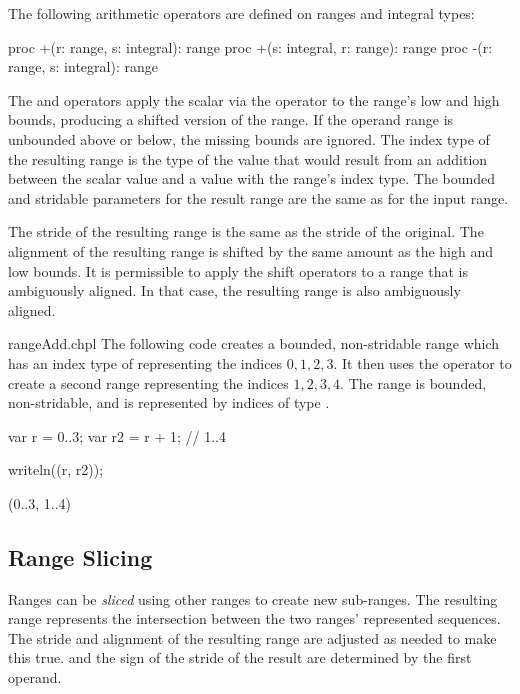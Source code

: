 The following arithmetic operators are defined on ranges and integral
types:

\begin{chapel}
proc +(r: range, s: integral): range
proc +(s: integral, r: range): range
proc -(r: range, s: integral): range
\end{chapel}

The \chpl{+} and \chpl{-} operators apply the scalar via the operator
to the range's low and high bounds, producing a shifted version of the
range.  If the operand range is unbounded above or below, the missing bounds
are ignored.
The index type of the resulting range is the type of the value
that would result from an addition between the scalar value and a value
with the range's index type.  The bounded and stridable parameters for
the result range are the same as for the input range.

The stride of the resulting range is the same as the stride of the
original. The alignment of the resulting range is shifted by the same amount as
the high and low bounds.  It is permissible to apply the shift operators to a
range that is ambiguously aligned.  In that case, the resulting range is also
ambiguously aligned.

\begin{chapelexample}{rangeAdd.chpl}
The following code creates a bounded, non-stridable range 
which has an index type of  representing the indices ${0, 1, 2, 3}$.  
It then uses the \chpl{+} operator to create a second range 
representing the indices ${1, 2, 3, 4}$.  The  range is bounded,
non-stridable, and is represented by indices of type .
\begin{chapel}
var r = 0..3;
var r2 = r + 1;    // 1..4
\end{chapel}
\begin{chapelpost}
writeln((r, r2));
\end{chapelpost}
\begin{chapeloutput}
(0..3, 1..4)
\end{chapeloutput}
\end{chapelexample}


\subsection{Range Slicing}
\label{Range_Slicing}

Ranges can be \emph{sliced} using other ranges to create new
sub-ranges.  The resulting range represents the intersection between
the two ranges' represented sequences.  The stride and alignment of the resulting range are adjusted as
needed to make this true.
 and the sign of the stride of the result are determined
by the first operand.

